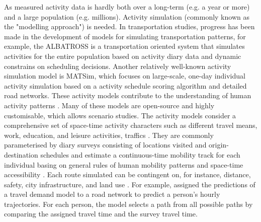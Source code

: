 \documentclass[]{article}
\begin{document}
As measured activity data is hardly both over a long-term (e.g. a year or more) and a large population (e.g. millions). Activity simulation (commonly known as the "modelling approach") is needed. In transportation studies, progress has been made in the development of models for simulating transportation patterns, for example, the ALBATROSS \citep{ALBATROSS} is a transportation oriented system that simulates activities for the entire population based on activity diary data and dynamic constrains on scheduling decisions. Another relatively well-known activity simulation model is MATSim\citep{w2016multi}, which focuses on large-scale, one-day individual activity simulation based on a activity schedule scoring algorithm and detailed road networks. These activity models contribute to the understanding of human activity patterns \citep{miller2003prototype}. Many of these models are open-source \citep{w2016multi} and highly customisable, which allows scenario studies. The activity models consider a comprehensive set of space-time activity characters such as different travel means, work, education, and leisure activities, traffics \citep{w2016multi}. They are commonly parameterised by diary surveys consisting of locations visited and origin-destination schedules and estimate a continuous-time mobility track for each individual basing on general rules of human mobility patterns and space-time accessibility \citep{nguyen2011steps,gonzalez2008understanding,yang2010using,yu2006spatio,alessandretti2017multi,miller1991modelling}. Each route simulated can be contingent on, for instance, distance, safety, city infrastructure, and land use \citep{law2014measuring}. For example, \cite{shekarrizfard2017regional} assigned the predictions of a travel demand model to a road network to predict a person's hourly trajectories. For each person, the model selects a path from all possible paths by comparing the assigned travel time and the survey travel time. 
\end{document}
